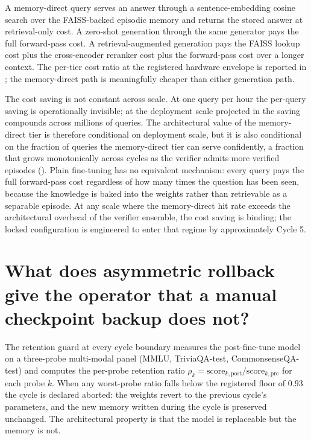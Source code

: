 A memory-direct query serves an answer through a sentence-embedding cosine search over the FAISS-backed episodic memory and returns the stored answer at retrieval-only cost. A zero-shot generation through the same generator pays the full forward-pass cost. A retrieval-augmented generation pays the FAISS lookup cost plus the cross-encoder reranker cost plus the forward-pass cost over a longer context. The per-tier cost ratio at the registered hardware envelope is reported in ; the memory-direct path is meaningfully cheaper than either generation path.

The cost saving is not constant across scale. At one query per hour the per-query saving is operationally invisible; at the deployment scale projected in  the saving compounds across millions of queries. The architectural value of the memory-direct tier is therefore conditional on deployment scale, but it is also conditional on the fraction of queries the memory-direct tier can serve confidently, a fraction that grows monotonically across cycles as the verifier admits more verified episodes (). Plain fine-tuning has no equivalent mechanism: every query pays the full forward-pass cost regardless of how many times the question has been seen, because the knowledge is baked into the weights rather than retrievable as a separable episode. At any scale where the memory-direct hit rate exceeds the architectural overhead of the verifier ensemble, the cost saving is binding; the locked configuration is engineered to enter that regime by approximately Cycle 5.


\section[Asymmetric rollback vs manual backup]{What does asymmetric rollback give the operator that a manual checkpoint backup does not?}
\label{app:qa-asymmetric-rollback}

The retention guard at every cycle boundary measures the post-fine-tune model on a three-probe multi-modal panel (MMLU, TriviaQA-test, CommonsenseQA-test) and computes the per-probe retention ratio $\rho_{k} = \mathrm{score}_{k,\text{post}} / \mathrm{score}_{k,\text{pre}}$ for each probe $k$. When any worst-probe ratio falls below the registered floor of $0.93$ the cycle is declared aborted: the weights revert to the previous cycle's parameters, and the new memory written during the cycle is preserved unchanged. The architectural property is that the model is replaceable but the memory is not.

